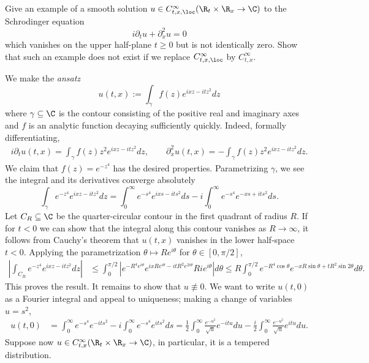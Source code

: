 \begin{statement}
	Give an example of a smooth solution $u \in C^\infty_{t, x, \loc} (\R_t \times \R_x \to \C)$ to the Schrodinger equation 
		\[ i \partial_t u + \partial_x^2 u = 0 \]
	which vanishes on the upper half-plane $t \geq 0$ but is not identically zero. Show that such an example does not exist if we replace $C^\infty_{t, x, \loc}$ by $C^\infty_{t, x}$. 	
\end{statement}

\begin{solution}
	We make the \textit{ansatz}
		\[ u(t, x) := \int_\gamma f(z) e^{i x z - i t z^2} dz \]
	where $\gamma \subseteq \C$ is the contour consisting of the positive real and imaginary axes and $f$ is an analytic function decaying sufficiently quickly. Indeed, formally differentiating, 
		\begin{align*}
			i\partial_t u (t, x) = \int_\gamma f(z) z^2 e^{i x z - i t z^2} dz, \qquad \partial_x^2 u(t, x) = -\int_\gamma f(z) z^2 e^{i x z - i t z^2} dz.  
		\end{align*}		
	We claim that $f(z) = e^{-z^4}$ has the desired properties. Parametrizing $\gamma$, we see the integral and its derivatives converge absolutely 
		\[ \int_\gamma e^{-z^4} e^{i x z - i t z^2} dz = \int_0^\infty e^{-s^4} e^{i x s - i t s^2} ds - i \int_0^\infty e^{-s^4} e^{- x s + i t s^2} ds. \]		
	Let $C_R \subseteq \C$ be the quarter-circular contour in the first quadrant of radius $R$. If for $t < 0$ we can show that the integral along this contour vanishes as $R \to \infty$, it follows from Cauchy's theorem that $u(t, x)$ vanishes in the lower half-space $t < 0$. Applying the parametrization $\theta \mapsto R e^{i \theta}$ for $\theta \in [0, \pi/2]$, 
		\begin{align*}
			 \left|\int_{C_R} e^{-z^4} e^{ixz - it z^2} dz\right| 
			 	&\leq \int_0^{\pi/2} \left|e^{- R^4 e^{i \theta}} e^{i x Re^{i \theta} - it R^2 e^{2 i \theta}} R i e^{i \theta} \right| d \theta \leq R \int_0^{\pi/2} e^{-R^4 \cos \theta} e^{- xR \sin \theta + t R^2 \sin 2\theta} d \theta.
		\end{align*} 	
	This proves the result. It remains to show that $u \not\equiv 0$. We want to write $u (t, 0)$ as a Fourier integral and appeal to uniqueness; making a change of variables $u = s^2$, 
		\begin{align*}
			 u(t, 0) 
			 	&= \int_0^\infty e^{-s^4} e^{- i t s^2} - i \int_0^\infty e^{-s^4} e^{i t s^2} ds = \frac12 \int_0^\infty \frac{e^{-u^2}}{\sqrt{u}} e^{-i t u} du -\frac{ i}{2} \int_0^\infty \frac{e^{-u^2}}{\sqrt{u}} e^{i t u} d u.
		\end{align*}	 	
	Suppose now $u \in C^\infty_{t, x} (\R_t \times \R_x \to \C)$, in particular, it is a tempered distribution. 	
\end{solution}

